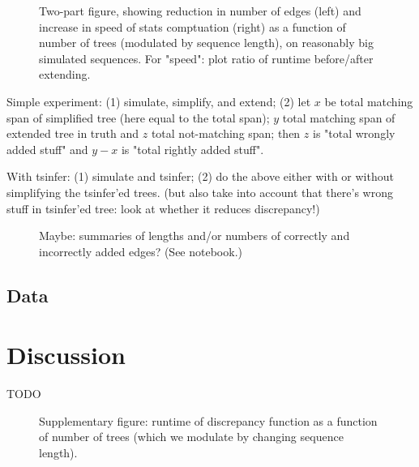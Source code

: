 \documentclass[10pt,twoside,lineno]{gsajnl}
\begin{document}
\begin{figure}
    \caption{
        Two-part figure, showing reduction in number of edges (left) and increase in speed of stats comptuation (right)
        as a function of number of trees (modulated by sequence length),
        on reasonably big simulated sequences.
        For "speed": plot ratio of runtime before/after extending.
        \label{fig:speed_and_edges}
    }
\end{figure}

Simple experiment:
(1) simulate, simplify, and extend;
(2) let $x$ be total matching span of simplified tree (here equal to the total span); $y$ total matching span of extended tree in truth and $z$ total not-matching span;
then $z$ is "total wrongly added stuff" and $y-x$ is "total rightly added stuff".

With tsinfer: (1) simulate and tsinfer; (2) do the above either with or without simplifying the tsinfer'ed trees.
(but also take into account that there's wrong stuff in tsinfer'ed tree: look at whether it reduces discrepancy!)

\begin{figure}
    \caption{
        Maybe: summaries of lengths and/or numbers of correctly and incorrectly added edges?
        (See notebook.)
        \label{fig:results_edges}
    }
\end{figure}

\subsection{Data}



\section{Discussion}

TODO



\appendix

\begin{figure}
    \caption{
        Supplementary figure: runtime of discrepancy function as a function of number of trees
        (which we modulate by changing sequence length).
        \label{fig:speed_discrepancy}
    }
\end{figure}
\end{document}
